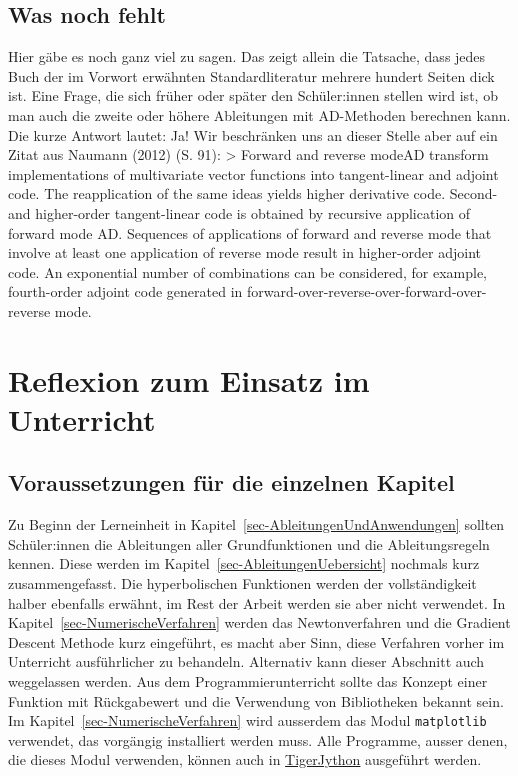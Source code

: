 \documentclass[
  a4paper,
  DIV=11]{scrreprt}
\theoremstyle{definition}
\theoremstyle{definition}
\theoremstyle{remark}
\begin{document}
\hypertarget{was-noch-fehlt}{%
\subsection{Was noch fehlt}\label{was-noch-fehlt}}

Hier gäbe es noch ganz viel zu sagen. Das zeigt allein die Tatsache,
dass jedes Buch der im Vorwort erwähnten Standardliteratur mehrere
hundert Seiten dick ist. Eine Frage, die sich früher oder später den
Schüler:innen stellen wird ist, ob man auch die zweite oder höhere
Ableitungen mit AD-Methoden berechnen kann. Die kurze Antwort lautet:
Ja! Wir beschränken uns an dieser Stelle aber auf ein Zitat aus Naumann
(2012) (S. 91): \textgreater{} Forward and reverse modeAD transform
implementations of multivariate vector functions into tangent-linear and
adjoint code. The reapplication of the same ideas yields higher
derivative code. Second- and higher-order tangent-linear code is
obtained by recursive application of forward mode AD. Sequences of
applications of forward and reverse mode that involve at least one
application of reverse mode result in higher-order adjoint code. An
exponential number of combinations can be considered, for example,
fourth-order adjoint code generated in
forward-over-reverse-over-forward-over-reverse mode.

\hypertarget{reflexion-zum-einsatz-im-unterricht}{%
\section{Reflexion zum Einsatz im
Unterricht}\label{reflexion-zum-einsatz-im-unterricht}}

\hypertarget{voraussetzungen-fuxfcr-die-einzelnen-kapitel}{%
\subsection{Voraussetzungen für die einzelnen
Kapitel}\label{voraussetzungen-fuxfcr-die-einzelnen-kapitel}}

Zu Beginn der Lerneinheit in Kapitel~\ref{sec-AbleitungenUndAnwendungen}
sollten Schüler:innen die Ableitungen aller Grundfunktionen und die
Ableitungsregeln kennen. Diese werden im
Kapitel~\ref{sec-AbleitungenUebersicht} nochmals kurz zusammengefasst.
Die hyperbolischen Funktionen werden der vollständigkeit halber
ebenfalls erwähnt, im Rest der Arbeit werden sie aber nicht verwendet.
In Kapitel~\ref{sec-NumerischeVerfahren} werden das Newtonverfahren und
die Gradient Descent Methode kurz eingeführt, es macht aber Sinn, diese
Verfahren vorher im Unterricht ausführlicher zu behandeln. Alternativ
kann dieser Abschnitt auch weggelassen werden. Aus dem
Programmierunterricht sollte das Konzept einer Funktion mit Rückgabewert
und die Verwendung von Bibliotheken bekannt sein. Im
Kapitel~\ref{sec-NumerischeVerfahren} wird ausserdem das Modul
\texttt{matplotlib} verwendet, das vorgängig installiert werden muss.
Alle Programme, ausser denen, die dieses Modul verwenden, können auch in
\href{https://tigerjython.ch/}{TigerJython} ausgeführt werden.
\end{document}
